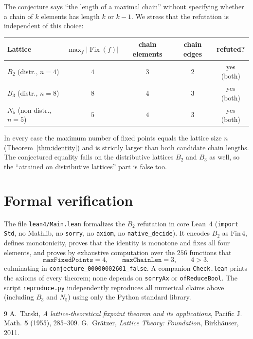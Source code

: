 \documentclass[11pt]{article}
\theoremstyle{definition}
\newcommand{\Fix}{\operatorname{Fix}}
\begin{document}
The conjecture says ``the length of a maximal chain'' without specifying
whether a chain of $k$ elements has length $k$ or $k-1$. We stress that the
refutation is independent of this choice:
\begin{center}
\begin{tabular}{lcccc}
\hline
Lattice & $\max_f |\Fix(f)|$ & chain elements & chain edges & refuted? \\
\hline
$B_2$ (distr., $n=4$) & $4$ & $3$ & $2$ & yes (both) \\
$B_3$ (distr., $n=8$) & $8$ & $4$ & $3$ & yes (both) \\
$N_5$ (non-distr., $n=5$) & $5$ & $4$ & $3$ & yes (both) \\
\hline
\end{tabular}
\end{center}
In every case the maximum number of fixed points equals the lattice size $n$
(Theorem~\ref{thm:identity}) and is strictly larger than both candidate chain
lengths. The conjectured equality fails on the distributive lattices $B_2$ and
$B_3$ as well, so the ``attained on distributive lattices'' part is false too.

\section{Formal verification}

The file \texttt{lean4/Main.lean} formalizes the $B_2$ refutation in core Lean~4
(\texttt{import Std}, no Mathlib, no \texttt{sorry}, no \texttt{axiom}, no
\texttt{native\_decide}). It encodes $B_2$ as $\mathrm{Fin}\,4$, defines
monotonicity, proves that the identity is monotone and fixes all four elements,
and proves by exhaustive computation over the $256$ functions that
\[
  \texttt{maxFixedPoints} = 4, \qquad
  \texttt{maxChainLen} = 3, \qquad
  4 > 3,
\]
culminating in \texttt{conjecture\_00000002601\_false}. A companion
\texttt{Check.lean} prints the axioms of every theorem; none depends on
\texttt{sorryAx} or \texttt{ofReduceBool}. The script \texttt{reproduce.py}
independently reproduces all numerical claims above (including $B_3$ and
$N_5$) using only the Python standard library.

\begin{thebibliography}{9}
A.~Tarski, \emph{A lattice-theoretical fixpoint theorem and its applications},
Pacific J. Math. \textbf{5} (1955), 285--309.
G.~Grätzer, \emph{Lattice Theory: Foundation}, Birkhäuser, 2011.
\end{thebibliography}
\end{document}

